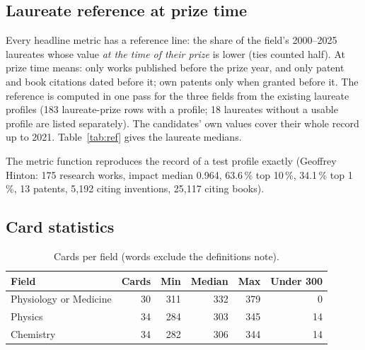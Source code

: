 \documentclass[11pt]{article}
\begin{document}
\subsection{Laureate reference at prize time}

Every headline metric has a reference line: the share of the field's 2000--2025 laureates whose value \emph{at the time
of their prize} is lower (ties counted half). At prize time means: only works published before the prize year, and only
patent and book citations dated before it; own patents only when granted before it. The reference is computed in one
pass for the three fields from the existing laureate profiles (183 laureate-prize rows with a profile; 18 laureates
without a usable profile are listed separately). The candidates' own values cover their whole record up to 2021.
Table~\ref{tab:ref} gives the laureate medians.

\begin{table}[ht]\centering\small
\caption{Medians of the laureate reference (2000--2025 laureates at prize time).}\label{tab:ref}
\end{table}

The metric function reproduces the record of a test profile exactly (Geoffrey Hinton: 175 research works, impact
median 0.964, 63.6\,\% top 10\,\%, 34.1\,\% top 1\,\%, 13 patents, 5{,}192 citing inventions, 25{,}117 citing books).

\subsection{Card statistics}

\begin{table}[ht]\centering\small\caption{Cards per field (words exclude the definitions note).}\label{tab:cardwords}
\begin{tabular}{lrrrrr}\toprule Field & Cards & Min & Median & Max & Under 300\\\midrule
Physiology or Medicine & 30 & 311 & 332 & 379 & 0\\
Physics & 34 & 284 & 303 & 345 & 14\\
Chemistry & 34 & 282 & 306 & 344 & 14\\
\bottomrule\end{tabular}\end{table}
\end{document}
